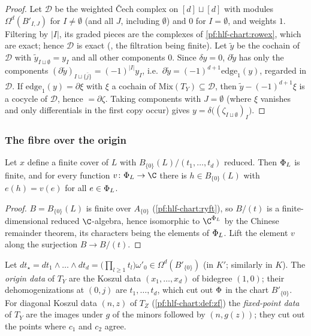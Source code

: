 \begin{proof}
Let $\mathcal D$ be the weighted \v{C}ech complex on $[d]\sqcup[d]$ with modules $\Omega^d(B'_{I,J})$ for $I\ne\emptyset$ (and all $J$, including $\emptyset$)
and $0$ for $I=\emptyset$, and weights $1$. Filtering by $|I|$, its graded pieces are the complexes of \cref{pf:hlf-chart:rowex}, which are exact; hence
$\mathcal D$ is exact (\cite[Lemma~2.7.3]{Weibel1994}, the filtration being finite). Let $\tilde y$ be the cochain of $\mathcal D$ with
$\tilde y_{I\sqcup\emptyset}=y_I$ and all other components $0$. Since $\delta y=0$, $\partial\tilde y$ has only the components
$(\partial\tilde y)_{I\sqcup\{\bar j\}}=(-1)^{|I|}y_I$, i.e.\ $\partial\tilde y=(-1)^{d+1}\mathrm{edge}_1(y)$, regarded in $\mathcal D$. If
$\mathrm{edge}_1(y)=\partial\xi$ with $\xi$ a cochain of $\mathrm{Mix}(T_Y)\subseteq\mathcal D$, then $\tilde y-(-1)^{d+1}\xi$ is a cocycle of $\mathcal D$, hence
$=\partial\zeta$. Taking components with $J=\emptyset$ (where $\xi$ vanishes and only differentials in the first copy occur) gives
$y=\delta\bigl((\zeta_{I\sqcup\emptyset})_I\bigr)$.
\end{proof}

\subsubsection*{The fibre over the origin}

\begin{lemma}\label{pf:hlf-chart:crt}
Let $x$ define a finite cover of $L$ with $B_{\{0\}}(L)/(t_1,\dots,t_d)$ reduced. Then $\Phi_L$ is finite, and for every function
$v\colon\hlfcfib_L\to\C$ there is $h\in B_{\{0\}}(L)$ with $e(h)=v(e)$ for all $e\in\Phi_L$.
\end{lemma}

\begin{proof}
$B=B_{\{0\}}(L)$ is finite over $A_{\{0\}}$ (\cref{pf:hlf-chart:ryft}), so $B/(t)$ is a finite-dimensional reduced $\C$-algebra, hence isomorphic to
$\C^{\hlfcfib_L}$ by the Chinese remainder theorem, its characters being the elements of $\Phi_L$. Lift the element $v$ along the surjection
$B\to B/(t)$.
\end{proof}

Let $dt_\star=dt_1\wedge\dots\wedge dt_d=\bigl(\prod_{l\ge1}t_l\bigr)\omega'_0\in\Omega^d(B'_{\{0\}})$ (in $K'$; similarly in $K$). The \emph{origin data} of
$T_Y$ are the Koszul data $(x_1,\dots,x_d)$ of bidegree $(1,0)$; their dehomogenizations at $(0,j)$ are $t_1,\dots,t_d$, which cut out
$\Phi$ in the chart $B'_{\{0\}}$. For diagonal Koszul data $(n,z)$ of $T_Z$ (\cref{pf:hlf-chart:def:zf}) the \emph{fixed-point data} of $T_Y$ are the
images under $g$ of the minors followed by $(n,g(z))$; they cut out the points where $c_1$ and $c_2$ agree.

